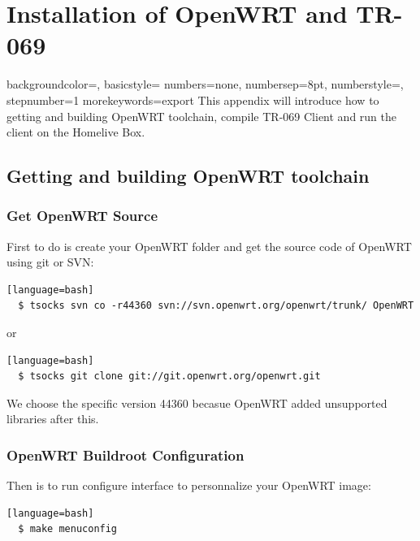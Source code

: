 
\chapter{Installation of OpenWRT and TR-069} %

\label{AppendixA} %


{
    backgroundcolor=\color{black},
    basicstyle=\scriptsize\color{white}\ttfamily
    numbers=none,
    numbersep=8pt,                   %
    numberstyle=\tiny\color{white}, %
    stepnumber=1                    %
}
{
  morekeywords={export}
}
This appendix will introduce how to getting and building OpenWRT toolchain, compile TR-069 Client and run the client on the Homelive Box.
\section{Getting and building OpenWRT toolchain}

\subsection{Get OpenWRT Source}
First to do is create your OpenWRT folder and get the source code of OpenWRT using git or SVN:
\begin{lstlisting}[style=DOS][language=bash]
  $ tsocks svn co -r44360 svn://svn.openwrt.org/openwrt/trunk/ OpenWRT
\end{lstlisting}
or
\begin{lstlisting}[style=DOS][language=bash]
  $ tsocks git clone git://git.openwrt.org/openwrt.git
\end{lstlisting}

We choose the specific version 44360 becasue OpenWRT added unsupported libraries after this.

\subsection{OpenWRT Buildroot Configuration}
Then is to run configure interface to personnalize your OpenWRT image:
\begin{lstlisting}[style=DOS][language=bash]
  $ make menuconfig
\end{lstlisting}

